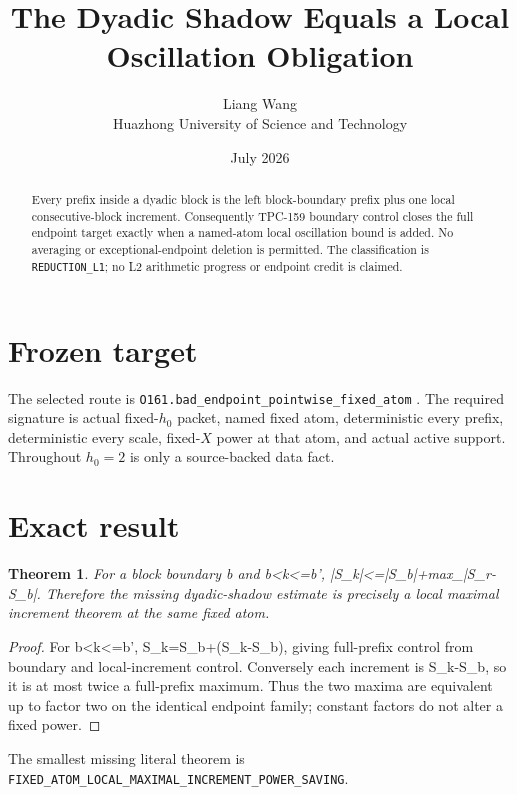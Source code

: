 \documentclass[11pt]{article}
\title{\textbf{The Dyadic Shadow Equals a Local Oscillation Obligation}}
\author{Liang Wang\\Huazhong University of Science and Technology}
\date{July 2026}
\newtheorem{theorem}{Theorem}
\begin{document}
\maketitle
\begin{abstract}
Every prefix inside a dyadic block is the left block-boundary prefix plus one local consecutive-block increment.  Consequently TPC-159 boundary control closes the full endpoint target exactly when a named-atom local oscillation bound is added.  No averaging or exceptional-endpoint deletion is permitted.
The classification is \texttt{REDUCTION\_\allowbreak{}L1}; no L2 arithmetic
progress or endpoint credit is claimed.
\end{abstract}

\section{Frozen target}
The selected route is \texttt{O161.bad\_\allowbreak{}endpoint\_\allowbreak{}pointwise\_\allowbreak{}fixed\_\allowbreak{}atom} \citep{TPC182}.  The required
signature is actual fixed-$h_0$ packet, named fixed atom, deterministic every
prefix, deterministic every scale, fixed-$X$ power at that atom, and actual
active support.  Throughout $h_0=2$ is only a source-backed data fact.

\section{Exact result}
\begin{theorem}
For a block boundary b and b<k<=b', |S\_\allowbreak{}k|<=|S\_\allowbreak{}b|+max\_|S\_\allowbreak{}r-S\_\allowbreak{}b|.  Therefore the missing dyadic-shadow estimate is precisely a local maximal increment theorem at the same fixed atom.
\end{theorem}
\begin{proof}
For b<k<=b', S\_\allowbreak{}k=S\_\allowbreak{}b+(S\_\allowbreak{}k-S\_\allowbreak{}b), giving full-prefix control from boundary and local-increment control.  Conversely each increment is S\_\allowbreak{}k-S\_\allowbreak{}b, so it is at most twice a full-prefix maximum.  Thus the two maxima are equivalent up to factor two on the identical endpoint family; constant factors do not alter a fixed power.
\end{proof}

The smallest missing literal theorem is
\texttt{FIXED\_\allowbreak{}ATOM\_\allowbreak{}LOCAL\_\allowbreak{}MAXIMAL\_\allowbreak{}INCREMENT\_\allowbreak{}POWER\_\allowbreak{}SAVING}.
\end{document}
